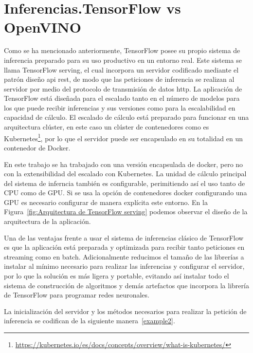\section{Inferencias.TensorFlow vs OpenVINO}\label{sec:inferencias.-TensorFlow-vs-OpenVINO}
Como se ha mencionado anteriormente, TensorFlow posee su propio sistema de inferencia preparado para su uso productivo en un entorno real. Este sistema se llama TensorFlow serving, el cual incorpora un servidor codificado mediante el patrón diseño api rest, de modo que las peticiones
de inferencia se realizan al servidor por medio del protocolo de transmisión de datos http.
La aplicación de TensorFlow está diseñada para el escalado tanto en el número de modelos para los que puede recibir inferencias y sus versiones como para la escalabilidad en capacidad de cálculo.
El escalado de cálculo está preparado para funcionar en una arquitectura clúster, en este caso un clúster de contenedores como es Kubernetes\footnote{\url{https://kubernetes.io/es/docs/concepts/overview/what-is-kubernetes/}}, por lo que el servidor puede ser encapsulado en su totalidad en un contenedor de Docker.

En este trabajo se ha trabajado con una versión encapsulada de docker, pero no con la extensibilidad del escalado con Kubernetes\cite{kubernetes}.
La unidad de cálculo principal del sistema de inferncia también es configurable, perimitiendo así el uso tanto de CPU como de GPU.
Si se usa la opción de contenedores docker configurando una GPU es necesario configurar de manera explícita este entorno.
En la Figura~\ref{fig:Arquitectura de TensorFlow serving} podemos observar el diseño de la arquitectura de la aplicación.

Una de las ventajas frente a usar el sistema de inferencias clásico de TensorFlow es que la aplicación está preparada y optimizada para recibir tanto peticiones en streaming como en batch.
Adicionalmente reducimos el tamaño de las librerías a instalar al mínimo necesario para realizar las inferencias y configurar el servidor, por lo que la solución es más ligera y portable, evitando así
instalar todo el sistema de construcción de algoritmos y demás artefactos que incorpora la librería de TensorFlow para programar redes neuronales.

La inicialización del servidor y los métodos necesarios para realizar la petición de inferencia se codifican de la siguiente manera~\ref{example2}.

